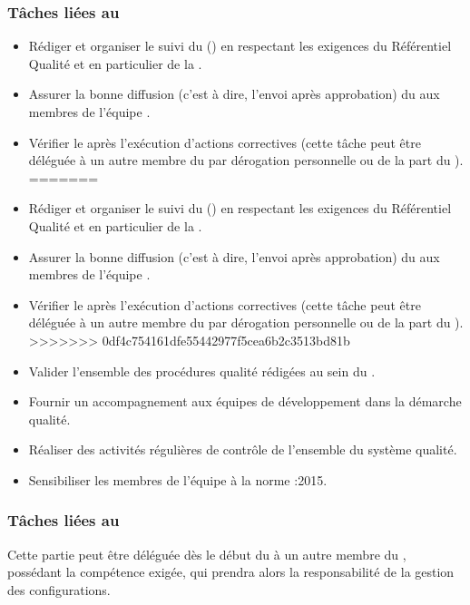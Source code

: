 \subsubsection*{Tâches liées au \PQCourt}
\begin{itemize}
<<<<<<< HEAD
	\item Rédiger et organiser le suivi du \PQ (\PQCourt) en respectant les exigences du Référentiel Qualité et en particulier de la \DGQDEUXCourt.
	\item Assurer la bonne diffusion (c’est à dire, l’envoi après approbation) du \PQCourt{} aux membres de l’équipe \PICCourt.
	\item Vérifier le \PQCourt{} après l’exécution d’actions correctives (cette tâche peut être déléguée à un autre membre du \PICCourt par dérogation personnelle ou de la part du \CP).
=======
	\item Rédiger et organiser le suivi du \PQ{} (\PQCourt) en respectant les exigences du Référentiel Qualité et en particulier de la \DGQDEUXCourt.
	\item Assurer la bonne diffusion (c’est à dire, l’envoi après approbation) du \PQCourt{} aux membres de l’équipe \PICCourt.
	\item Vérifier le \PQCourt{} après l’exécution d’actions correctives (cette tâche peut être déléguée à un autre membre du \PICCourt{} par dérogation personnelle ou de la part du \CP).
>>>>>>> 0df4c754161dfe55442977f5cea6b2c3513bd81b
	\item Valider l’ensemble des procédures qualité rédigées au sein du \PICCourt.
	\item Fournir un accompagnement aux équipes de développement dans la démarche qualité.
	\item Réaliser des activités régulières de contrôle de l’ensemble du système qualité.
	\item Sensibiliser les membres de l’équipe \PICCourt{} à la norme :2015.
\end{itemize}

\subsubsection*{Tâches liées au \PGCCourt}

Cette partie peut être déléguée dès le début du \PICCourt{} à un autre membre du \PICCourt{}, possédant la compétence exigée, qui prendra alors la responsabilité de la gestion des configurations.

